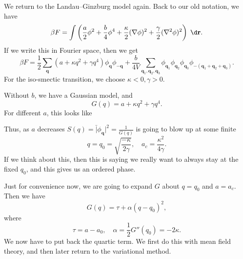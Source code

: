 \documentclass[a4paper]{article}
\begin{document}
We return to the Landau--Ginzburg model again. Back to our old notation, we have
\[
  \beta F = \int \left(\frac{a}{2} \phi^2 + \frac{b}{4} \phi^4 + \frac{\kappa}{2} (\nabla \phi)^2 + \frac{\gamma}{2} (\nabla^2 \phi)^2\right)\;\d \mathbf{r}.
\]
If we write this in Fourier space, then we get
\[
  \beta F = \frac{1}{2} \sum_{\mathbf{q}} (a + \kappa q^2 + \gamma q^4) \phi_{\mathbf{q}} \phi_{-\mathbf{q}} + \frac{b}{4V} \sum_{\mathbf{q}_1, \mathbf{q}_2, \mathbf{q}_3} \phi_{\mathbf{q}_1} \phi_{\mathbf{q}_2} \phi_{\mathbf{q}_3} \phi_{-(\mathbf{q}_1 + \mathbf{q}_2 + \mathbf{q}_3)}.
\]
For the iso-smectic transition, we choose $\kappa < 0, \gamma > 0$.

Without $b$, we have a Gaussian model, and
\[
  G(q) = a + \kappa q^2 + \gamma q^4.
\]
For different $a$, this looks like
\begin{center}
\end{center}

Thus, as $a$ decreases $S(q) = \bar |\phi_\mathbf{q}|^2 = \frac{1}{G(q)}$ is going to blow up at some finite
\[
  q = q_0 = \sqrt{\frac{-\kappa}{2\gamma}},\quad a_c = \frac{\kappa^2}{4 \gamma}.
\]
If we think about this, then this is saying we really want to always stay at the fixed $q_0$, and this gives us an ordered phase.

Just for convenience now, we are going to expand $G$ about $q = q_0$ and $a = a_c$. Then we have
\[
  G(q) = \tau + \alpha(q - q_0)^2,
\]
where
\[
  \tau = a - a_0,\quad \alpha = \frac{1}{2} G''(q_0) = - 2\kappa.
\]
We now have to put back the quartic term. We first do this with mean field theory, and then later return to the variational method.
\end{document}

